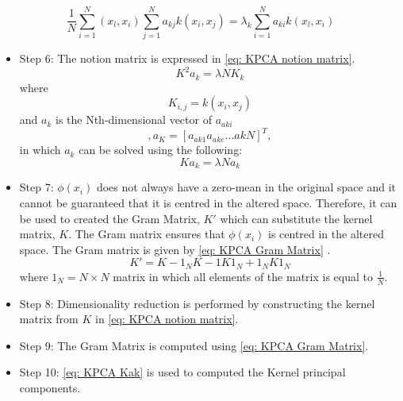 \documentclass[11pt]{article}
\begin{document}
	\begin{equation}
	\label{eq: KPCA multiplied}
	\frac{1}{N}\sum_{i=1}^{N}(x_l, x_i)\sum_{j=1}^{N}a_{kj}k(x_i, x_j) = \lambda_k\sum_{i=1}^{N}a_{ki}k(x_l, x_i)
	\end{equation}
	\begin{itemize}
		\item Step 6: The notion matrix is expressed in \eqref{eq: KPCA notion matrix}.
		\begin{equation}
			\label{eq: KPCA notion matrix}
			K^2a_k = \lambda N K_{k} 
		\end{equation}
		where 
		\begin{equation}
			K_{i,j} = k(x_i, x_j)
		\end{equation}
		and $a_k$ is the Nth-dimensional vector of $a_{aki}$
		\begin{equation},
			a_{K} = [a_{ak1}a_{ake} . . . akN]^T,
		\end{equation}
		in which $a_k$ can be solved using the following:
		\begin{equation}
			\label{eq: KPCA Kak}
			Ka_k = \lambda N a_k
		\end{equation} 
		\item Step 7: $\phi(x_i)$ does not always have a zero-mean in the original space and it cannot be guaranteed that it is centred in the altered space. Therefore, it can be used to created the Gram Matrix, $K'$ which can substitute the kernel matrix, $K$. The Gram matrix ensures that $\phi(x_i)$ is centred in the altered space. The Gram matrix is given by \eqref{eq: KPCA Gram Matrix} \cite{Ibrahim_Baharudin2016, Scholkopf2012}.
		\begin{equation}
			\label{eq: KPCA Gram Matrix}
			K' = K - 1_N K - 1K1_N + 1_NK1_N
		\end{equation}
		where $1_N = N \times N$ matrix in which all elements of the matrix is equal to $\frac{1}{N}$.\\
		\item Step 8: Dimensionality reduction is performed by constructing the kernel matrix from $K$ in \eqref{eq: KPCA notion matrix}. \\
		\item Step 9: The Gram Matrix is computed using \eqref{eq: KPCA Gram Matrix}. \\
		\item Step 10: \eqref{eq: KPCA Kak} is used to computed the Kernel principal components.
	\end{itemize}
\end{document}
